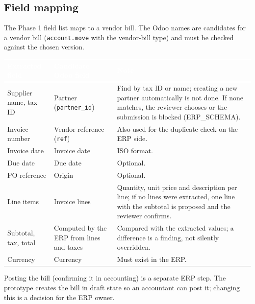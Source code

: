\documentclass[11pt,a4paper]{report}
\newcommand{\hdr}[1]{\textcolor{white}{\sffamily\bfseries #1}}
\newcommand{\tblstart}{\rowcolors{2}{white}{rowgray}\arrayrulecolor{teal!60}}
\newcommand{\hdrrow}{\rowcolor{navy}}
\begin{document}
\subsection{Field mapping}
The Phase 1 field list maps to a vendor bill. The Odoo names are candidates for a vendor bill (\texttt{account.move} with the vendor-bill type) and must be checked against the chosen version.
{\tblstart\small
\begin{longtable}{L{3.4cm}L{4.2cm}L{6.2cm}}
\hdrrow \hdr{Extracted field} & \hdr{Candidate Odoo field} & \hdr{Note}\\ \endhead
Supplier name, tax ID & Partner (\texttt{partner\_id}) & Find by tax ID or name; creating a new partner automatically is not done. If none matches, the reviewer chooses or the submission is blocked (ERP\_SCHEMA).\\
Invoice number & Vendor reference (\texttt{ref}) & Also used for the duplicate check on the ERP side.\\
Invoice date & Invoice date & ISO format.\\
Due date & Due date & Optional.\\
PO reference & Origin & Optional.\\
Line items & Invoice lines & Quantity, unit price and description per line; if no lines were extracted, one line with the subtotal is proposed and the reviewer confirms.\\
Subtotal, tax, total & Computed by the ERP from lines and taxes & Compared with the extracted values; a difference is a finding, not silently overridden.\\
Currency & Currency & Must exist in the ERP.\\
\hline
\end{longtable}}
Posting the bill (confirming it in accounting) is a separate ERP step. The prototype creates the bill in draft state so an accountant can post it; changing this is a decision for the ERP owner.
\end{document}
